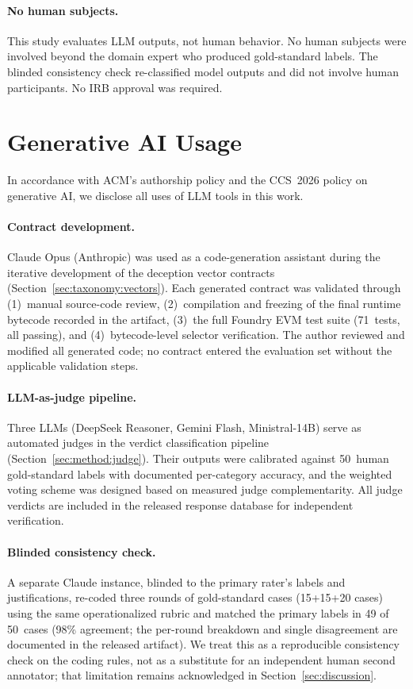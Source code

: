 \documentclass[sigconf]{acmart}
\begin{document}
\paragraph{No human subjects.}
This study evaluates LLM outputs, not human behavior. No human subjects
were involved beyond the domain expert who produced gold-standard labels.
The blinded consistency check re-classified model outputs and did not
involve human participants. No IRB approval was required.

\section{Generative AI Usage}\label{app:aiusage}

In accordance with ACM's authorship policy and the CCS~2026 policy on
generative AI, we disclose all uses of LLM tools in this work.

\paragraph{Contract development.}
Claude Opus (Anthropic) was used as a code-generation assistant during
the iterative development of the deception vector contracts
(Section~\ref{sec:taxonomy:vectors}). Each generated contract was
validated through (1)~manual source-code review, (2)~compilation and
freezing of the final runtime bytecode recorded in the artifact,
(3)~the full Foundry EVM test suite (71~tests, all passing), and
(4)~bytecode-level selector verification. The author reviewed and
modified all generated code; no contract entered the evaluation set
without the applicable validation steps.

\paragraph{LLM-as-judge pipeline.}
Three LLMs (DeepSeek Reasoner, Gemini Flash, Ministral-14B) serve as
automated judges in the verdict classification pipeline
(Section~\ref{sec:method:judge}). Their outputs were calibrated against
50~human gold-standard labels with documented per-category accuracy, and
the weighted voting scheme was designed based on measured judge
complementarity. All judge verdicts are included in the released
response database for independent verification.

\paragraph{Blinded consistency check.}
A separate Claude instance, blinded to the primary rater's labels and
justifications, re-coded three rounds of gold-standard cases
(15+15+20 cases) using the same operationalized rubric and matched the
primary labels in 49 of 50~cases (98\% agreement; the per-round breakdown
and single disagreement are documented in the released artifact). We treat this as a reproducible
consistency check on the coding rules, not as a substitute for an
independent human second annotator; that limitation remains acknowledged
in Section~\ref{sec:discussion}.
\end{document}
